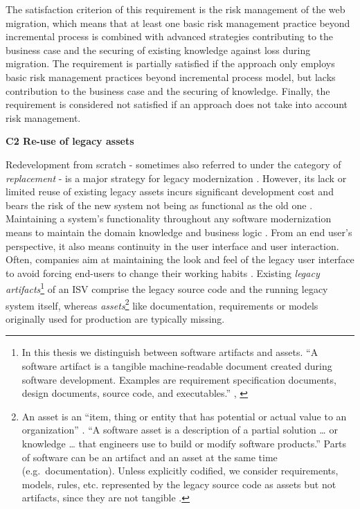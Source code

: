 The satisfaction criterion of this requirement is the risk management of the web migration, which means that at least one basic risk management practice beyond incremental process is combined with advanced strategies contributing to the business case and the securing of existing knowledge against loss during migration.
The requirement is partially satisfied if the approach only employs basic risk management practices beyond incremental process model, but lacks contribution to the business case and the securing of knowledge.
Finally, the requirement is considered not satisfied if an approach does not take into account risk management.

\textbf{C2 Re-use of legacy assets}


Redevelopment from scratch - sometimes also referred to under the category of \emph{replacement} \autocite{Almonaies2010SOAStrategies} - is a major strategy for legacy modernization \autocite{Wagner2014Fundamentals,Khadka2016PHD,Sneed2010SoftwareMigration,Almonaies2010SOAStrategies,Bisbal1999LegacyInformationSystems}.
However, its lack or limited reuse of existing legacy assets incurs significant development cost \autocite{Khadka2016PHD} and bears the risk of the new system not being as functional as the old one \autocite{Almonaies2010SOAStrategies}.
Maintaining a system's functionality throughout any software modernization means to maintain the domain knowledge and business logic \autocite{Wagner2014Fundamentals}.
From an end user's perspective, it also means continuity in the user interface and user interaction.
Often, companies aim at maintaining the look and feel of the legacy user interface to avoid forcing end-users to change their working habits \autocite{Rodriguez-Echeverria2012MIGRARIA,Lucia2008,Distante2002}.
Existing \emph{legacy artifacts}\footnote{In this thesis we distinguish between software artifacts and assets.
``A software artifact is a tangible machine-readable document created during software development.
Examples are requirement specification documents, design documents, source code, and executables.'' \autocite{OMG2016KDM}, \autocite[cf.~\emph{physical asset}][]{ISO/IEEE24765Vocabulary}} of an ISV comprise the legacy source code and the running legacy system itself, whereas \emph{assets}\footnote{An asset is an ``item, thing or entity that has potential or actual value to an organization'' \autocite{ISO/IEEE24765Vocabulary}.
``A software asset is a description of a partial solution \ldots{} or knowledge \ldots{} that engineers use to build or modify software products.'' \autocite{OMG2016KDM} Parts of software can be an artifact and an asset at the same time (e.g.~documentation).
Unless explicitly codified, we consider requirements, models, rules, etc.
represented by the legacy source code as assets but not artifacts, since they are not tangible \autocite[cf.~\emph{intangible assets}][]{ISO/IEEE24765Vocabulary}.} like documentation, requirements or models originally used for production are typically missing.
